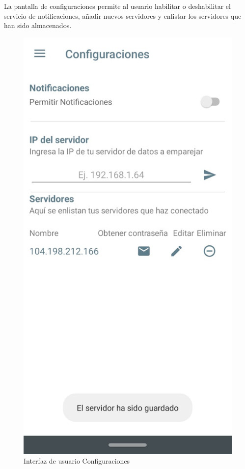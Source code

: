 La pantalla de configuraciones permite al usuario habilitar o deshabilitar el servicio de notificaciones, añadir nuevos servidores y enlistar los servidores que han sido almacenados.

\begin{figure}[H]
	\centering
	\includegraphics[scale=0.4]{Capitulo4/software/submodulos/images/man6.png}
	\caption{Interfaz de usuario Configuraciones}
	\label{fig:Configuraciones}
\end{figure}


